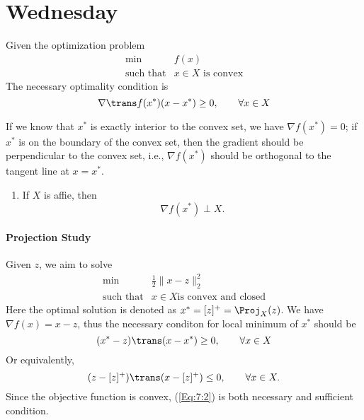
\section{Wednesday}
Given the optimization problem
\[
\begin{array}{ll}
\min&f(x)\\
\mbox{such that}&x\in X\mbox{ is convex}
\end{array}
\]
The necessary optimality condition is
\[
\nabla\trans f(x^*)(x-x^*)\ge0,\qquad
\forall x\in X
\]

If we know that $x^*$ is exactly interior to the convex set, we have $\nabla f(x^*)=0$; if $x^*$ is on the boundary of the convex set, then the gradient should be perpendicular to the convex set, i.e., $\nabla f(x^*)$ should be orthogonal to the tangent line at $x=x^*$.
\begin{enumerate}
\item
If $X$ is affie, then
\[
\nabla f(x^*)\perp X.
\]
\end{enumerate}
\paragraph{Projection Study}Given $z$, we aim to solve
\[
\begin{array}{ll}
\min&\frac{1}{2}\|x-z\|_2^2\\
\mbox{such that}&x\in X\mbox{is convex and closed}
\end{array}
\]
Here the optimal solution is denoted as $x^*=[z]^+=\Proj_X(z)$. We have $\nabla f(x) = x-z$, thus the necessary conditon for local minimum of $x^*$ should be
\[
(x^*-z)\trans(x-x^*)\ge0,\qquad\forall x\in X
\]
Or equivalently,
\begin{equation}
(z-[z]^+)\trans(x-[z]^+)\le0,\qquad\forall x\in X.\label{Eq:7:2}
\end{equation}
Since the objective function is convex, (\ref{Eq:7:2}) is both necessary and sufficient condition.


